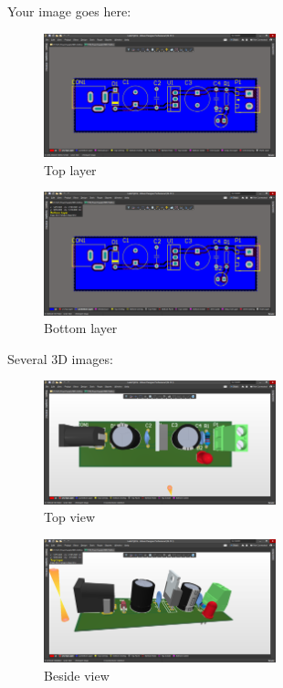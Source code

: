 Your image goes here:
\begin{figure}[h!bp]
    \centering
    \includegraphics[width=0.6\textwidth]{graphics/ex1/f2.PNG}
    \caption{Top layer}
\end{figure}
\begin{figure}[t]
    \centering
    \includegraphics[width=0.6\textwidth]{graphics/ex1/f3.PNG}
    \caption{Bottom layer}
\end{figure}
\newpage
Several 3D images:
\begin{figure}[h]
    \centering
    \includegraphics[width=0.6\textwidth]{graphics/ex1/f4.PNG}
    \caption{Top view}
\end{figure}
\begin{figure}[h!bp]
    \centering
    \includegraphics[width=0.6\textwidth]{graphics/ex1/f5.PNG}
    \caption{Beside view}
\end{figure}
